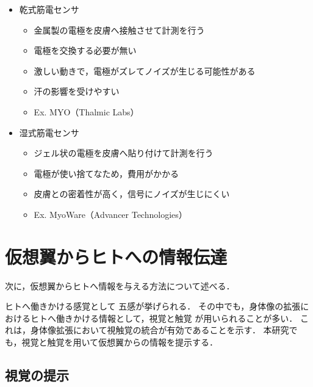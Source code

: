         \begin{itemize}
        \item 乾式筋電センサ
            \begin{itemize}
            \item 金属製の電極を皮膚へ接触させて計測を行う
            \item 電極を交換する必要が無い
            \item 激しい動きで，電極がズレてノイズが生じる可能性がある
            \item 汗の影響を受けやすい
            \item Ex. MYO（Thalmic Labs）
            \end{itemize}

        \item 湿式筋電センサ
            \begin{itemize}
            \item ジェル状の電極を皮膚へ貼り付けて計測を行う
            \item 電極が使い捨てなため，費用がかかる
            \item 皮膚との密着性が高く，信号にノイズが生じにくい
            \item Ex. MyoWare（Advancer Technologies）
            \end{itemize}
        \end{itemize}


\section{仮想翼からヒトへの情報伝達}
    次に，仮想翼からヒトへ情報を与える方法について述べる．

    ヒトへ働きかける感覚として
    五感が挙げられる．
    その中でも，身体像の拡張におけるヒトへ働きかける情報として，視覚と触覚
    が用いられることが多い．
    これは，身体像拡張において視触覚の統合が有効であることを示す．
    本研究でも，視覚と触覚を用いて仮想翼からの情報を提示する．

    \subsection{視覚の提示}
        
